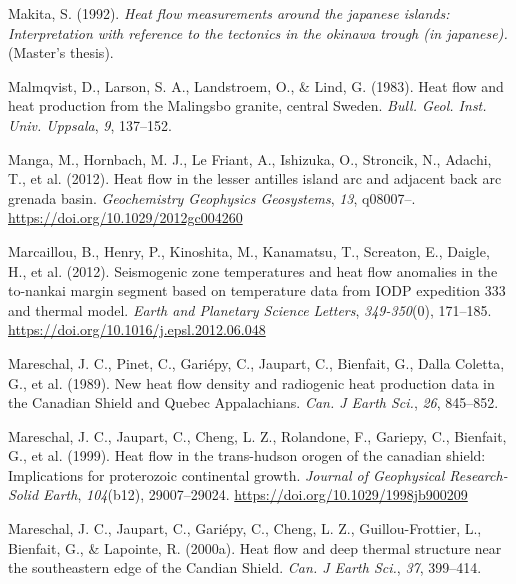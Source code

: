 \begin{CSLReferences}{1}{1}
\leavevmode{}%
Makita, S. (1992). \emph{Heat flow measurements around the japanese islands: Interpretation with reference to the tectonics in the okinawa trough (in japanese).} (Master's thesis).

\leavevmode{}%
Malmqvist, D., Larson, S. A., Landstroem, O., \& Lind, G. (1983). Heat flow and heat production from the {Malingsbo} granite, central {Sweden}. \emph{Bull. Geol. Inst. Univ. Uppsala}, \emph{9}, 137--152.

\leavevmode{}%
Manga, M., Hornbach, M. J., Le Friant, A., Ishizuka, O., Stroncik, N., Adachi, T., et al. (2012). Heat flow in the lesser antilles island arc and adjacent back arc grenada basin. \emph{Geochemistry Geophysics Geosystems}, \emph{13}, q08007--. \url{https://doi.org/10.1029/2012gc004260}

\leavevmode{}%
Marcaillou, B., Henry, P., Kinoshita, M., Kanamatsu, T., Screaton, E., Daigle, H., et al. (2012). Seismogenic zone temperatures and heat flow anomalies in the to-nankai margin segment based on temperature data from IODP expedition 333 and thermal model. \emph{Earth and Planetary Science Letters}, \emph{349-350}(0), 171--185. \url{https://doi.org/10.1016/j.epsl.2012.06.048}

\leavevmode{}%
Mareschal, J. C., Pinet, C., Gariépy, C., Jaupart, C., Bienfait, G., Dalla Coletta, G., et al. (1989). New heat flow density and radiogenic heat production data in the {Canadian Shield} and {Quebec Appalachians}. \emph{Can. J Earth Sci.}, \emph{26}, 845--852.

\leavevmode{}%
Mareschal, J. C., Jaupart, C., Cheng, L. Z., Rolandone, F., Gariepy, C., Bienfait, G., et al. (1999). Heat flow in the trans-hudson orogen of the canadian shield: Implications for proterozoic continental growth. \emph{Journal of Geophysical Research-Solid Earth}, \emph{104}(b12), 29007--29024. \url{https://doi.org/10.1029/1998jb900209}

\leavevmode{}%
Mareschal, J. C., Jaupart, C., Gariépy, C., Cheng, L. Z., Guillou-Frottier, L., Bienfait, G., \& Lapointe, R. (2000a). Heat flow and deep thermal structure near the southeastern edge of the {Candian Shield}. \emph{Can. J Earth Sci.}, \emph{37}, 399--414.


\end{CSLReferences}
